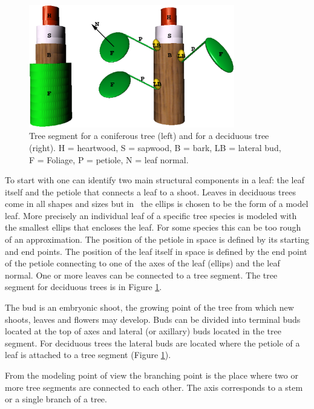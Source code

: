 \begin{figure}[h]
\begin{center}
\includegraphics[width=0.8\textwidth,height=0.5\textwidth]{lignum-segment}
\caption{\label{fig:segment} Tree segment for a coniferous tree (left) and
for a deciduous tree (right). H = heartwood, S =
sapwood, B = bark, LB = lateral bud, F = Foliage, P = petiole, N = leaf normal.}
\end{center}

\end{figure}
To start  with one  can identify two  main structural  components in a
leaf: the leaf itself and the petiole that connects a leaf to a shoot.
Leaves in deciduous trees come in all shapes and sizes but in \lignum\
the ellips is chosen to  be the form of a  model leaf.  More precisely
an individual leaf of a   specific tree species   is modeled with  the
smallest ellips that encloses the leaf.  For  some species this can be
too rough of  an approximation.  The position  of the petiole in space
is defined by  its starting and end  points.  The position of the leaf
itself in space is defined by the end  point of the petiole connecting
to one of the axes of the  leaf (ellips) and the  leaf normal.  One or
more leaves can be connected to a tree segment.   The tree segment for
deciduous trees is in Figure \ref{fig:segment}.

The bud is  an embryonic shoot,  the  growing point  of the  tree from
which new shoots, leaves and flowers may develop.  Buds can be divided
into  terminal buds   located at the   top of  axes  and  lateral  (or
axillary)  buds located in the  tree segment.  For deciduous trees the
lateral buds are located where the petiole of  a leaf is attached to a
tree segment (Figure \ref{fig:segment}).

From the modeling point of view the branching point is the place where
two or more  tree  segments are  connected  to each other.   The  axis
corresponds to a stem or a single branch of a tree.

